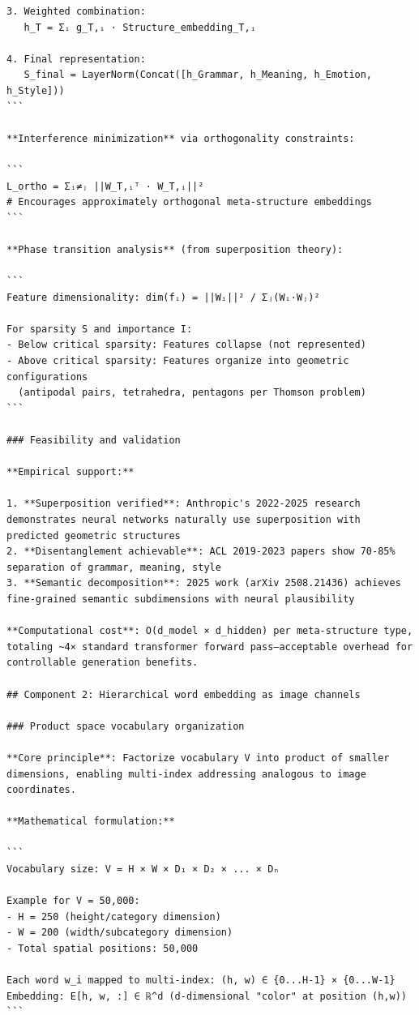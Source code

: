 \documentclass[11pt]{article}
\begin{document}
\begin{verbatim}
3. Weighted combination:
   h_T = Σᵢ g_T,ᵢ · Structure_embedding_T,ᵢ

4. Final representation:
   S_final = LayerNorm(Concat([h_Grammar, h_Meaning, h_Emotion, h_Style]))
```

**Interference minimization** via orthogonality constraints:

```
L_ortho = Σᵢ≠ⱼ ||W_T,ᵢᵀ · W_T,ᵢ||² 
# Encourages approximately orthogonal meta-structure embeddings
```

**Phase transition analysis** (from superposition theory):

```
Feature dimensionality: dim(fᵢ) = ||Wᵢ||² / Σⱼ(Wᵢ·Wⱼ)²

For sparsity S and importance I:
- Below critical sparsity: Features collapse (not represented)
- Above critical sparsity: Features organize into geometric configurations
  (antipodal pairs, tetrahedra, pentagons per Thomson problem)
```

### Feasibility and validation

**Empirical support:**

1. **Superposition verified**: Anthropic's 2022-2025 research demonstrates neural networks naturally use superposition with predicted geometric structures
2. **Disentanglement achievable**: ACL 2019-2023 papers show 70-85% separation of grammar, meaning, style
3. **Semantic decomposition**: 2025 work (arXiv 2508.21436) achieves fine-grained semantic subdimensions with neural plausibility

**Computational cost**: O(d_model × d_hidden) per meta-structure type, totaling ~4× standard transformer forward pass—acceptable overhead for controllable generation benefits.

## Component 2: Hierarchical word embedding as image channels

### Product space vocabulary organization

**Core principle**: Factorize vocabulary V into product of smaller dimensions, enabling multi-index addressing analogous to image coordinates.

**Mathematical formulation:**

```
Vocabulary size: V = H × W × D₁ × D₂ × ... × Dₙ

Example for V = 50,000:
- H = 250 (height/category dimension)
- W = 200 (width/subcategory dimension)
- Total spatial positions: 50,000

Each word w_i mapped to multi-index: (h, w) ∈ {0...H-1} × {0...W-1}
Embedding: E[h, w, :] ∈ ℝ^d (d-dimensional "color" at position (h,w))
```


\end{verbatim}
\end{document}
